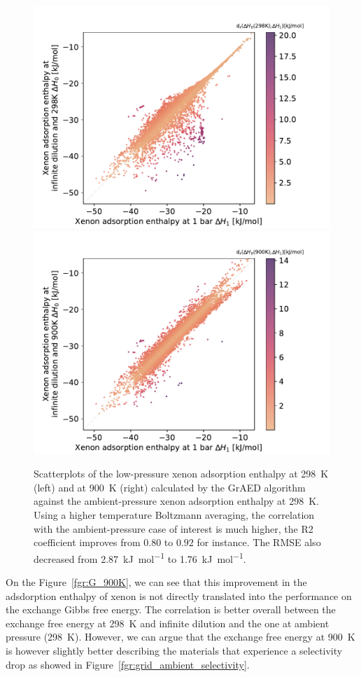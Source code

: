 \documentclass[main]{subfiles}
\begin{document}
\begin{figure}[ht]
\centering
  \includegraphics[width=0.45\linewidth]{figures/4-ml/SI_figure/Scatterplot_H1_H0.pdf}
  \includegraphics[width=0.45\linewidth]{figures/4-ml/SI_figure/Scatterplot_H1_H900K.pdf}
  \caption{Scatterplots of the low-pressure xenon adsorption enthalpy at \SI{298}{\kelvin} (left) and at \SI{900}{\kelvin} (right) calculated by the GrAED algorithm against the ambient-pressure xenon adsorption enthalpy at \SI{298}{\kelvin}. Using a higher temperature Boltzmann averaging, the correlation with the ambient-pressure case of interest is much higher, the R2 coefficient improves from $0.80$ to $0.92$ for instance. The RMSE also decreased from \SI{2.87}{\kilo\joule\per\mole} to \SI{1.76}{\kilo\joule\per\mole}. }\label{fgr:H_900K}
\end{figure}

On the Figure~\ref{fgr:G_900K}, we can see that this improvement in the adsdorption enthalpy of xenon is not directly translated into the performance on the exchange Gibbs free energy. The correlation is better overall between the exchange free energy at \SI{298}{\kelvin} and infinite dilution and the one at ambient pressure (\SI{298}{\kelvin}). However, we can argue that the exchange free energy at \SI{900}{\kelvin} is however slightly better describing the materials that experience a selectivity drop as showed in Figure~\ref{fgr:grid_ambient_selectivity}. 
\end{document}
